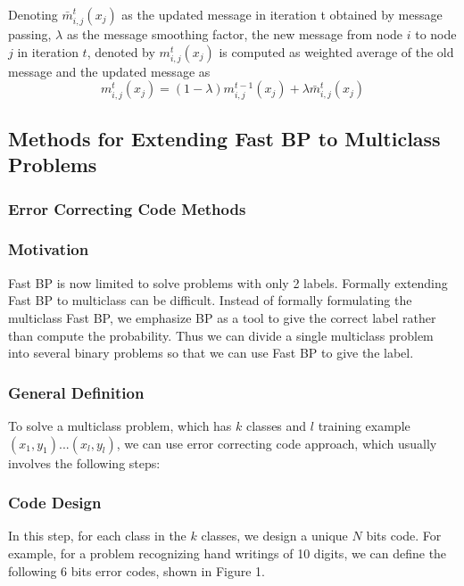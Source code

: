 Denoting $\bar{m}_{i,j}^{t}(x_{j})$ as the updated message in iteration t obtained by message passing, $\lambda$ as the message smoothing factor, the new message from node $i$ to node $j$ in iteration $t$, denoted by $m_{i,j}^{t}(x_{j})$ is computed as weighted average of the old message and the updated message as
\begin{equation}
    m_{i,j}^{t}(x_{j}) = (1-\lambda)m_{i,j}^{t-1}(x_{j}) + \lambda\bar{m}_{i,j}^{t}(x_{j})
\end{equation}

\subsection{Methods for Extending Fast BP to Multiclass Problems}

\subsubsection{Error Correcting Code Methods}

\subsubsection*{Motivation}
Fast BP is now limited to solve problems with only 2 labels. Formally extending Fast BP to multiclass can be difficult. Instead of formally formulating the multiclass Fast BP, we emphasize BP as a tool to give the correct label rather than compute the probability. Thus we can divide a single multiclass problem into several binary problems so that we can use Fast BP to give the label.


\subsubsection*{General Definition}

To solve a multiclass problem, which has $k$ classes and $l$ training example $(x_{1},y_{1})...(x_{l},y_{l})$, we can use error correcting code approach, which usually involves the following steps:

\subsubsection*{Code Design}

In this step, for each class in the $k$ classes, we design a unique $N$ bits code. For example, for a problem recognizing hand writings of 10 digits, we can define the following 6 bits error codes, shown in Figure 1.

